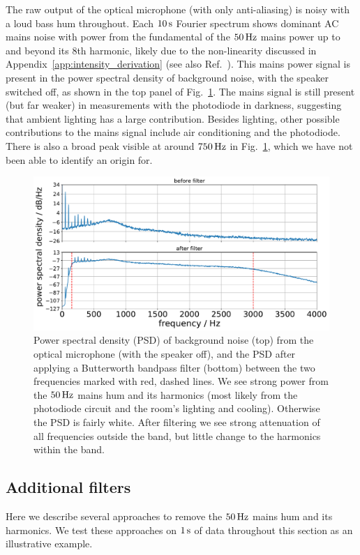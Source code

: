 \documentclass[paper-main.tex]{subfiles}
\begin{document}
The raw output of the optical microphone (with only anti-aliasing) is noisy with a loud bass hum throughout. 
Each $10\,{\rm s}$ Fourier spectrum shows dominant AC mains noise with power from the fundamental of the $50\,{\rm Hz}$ mains power up to and beyond its $8$th harmonic, likely due to the non-linearity discussed in Appendix~\ref{app:intensity_derivation} (see also Ref.~\cite{feynman}).
This mains power signal is present in the power spectral density of background noise, with the speaker switched off, as shown in the top panel of Fig.~\ref{fig:psd_noise}.
The mains signal is still present (but far weaker) in measurements with the photodiode in darkness, suggesting that ambient lighting has a large contribution.
Besides lighting, other possible contributions to the mains signal include air conditioning and the photodiode. 
There is also a broad peak visible at around $750\,{\rm Hz}$ in Fig.~\ref{fig:psd_noise}, which we have not been able to identify an origin for. 


\begin{figure}
	\includegraphics[width=.49\textwidth]{figures/psd_butterworth_14_6.pdf}
	\caption{\label{fig:psd_noise}
Power spectral density (PSD) of background noise (top) from the optical microphone (with the speaker off), and the PSD after applying a Butterworth bandpass filter (bottom) between the two frequencies marked with red, dashed lines. 
We see strong power from the $50\,{\rm Hz}$ mains hum and its harmonics (most likely from the photodiode circuit and the room’s lighting and cooling). Otherwise the PSD is fairly white. 
After filtering we see strong attenuation of all frequencies outside the band, but little change to the harmonics within the band.
}
\end{figure}


\subsection{Additional filters}
\label{sec:simple_filters}

Here we describe several approaches to remove the $50\,{\rm Hz}$ mains hum and its harmonics. 
We test these approaches on $1\,{\rm s}$ of data throughout this section as an illustrative example. 
\end{document}
